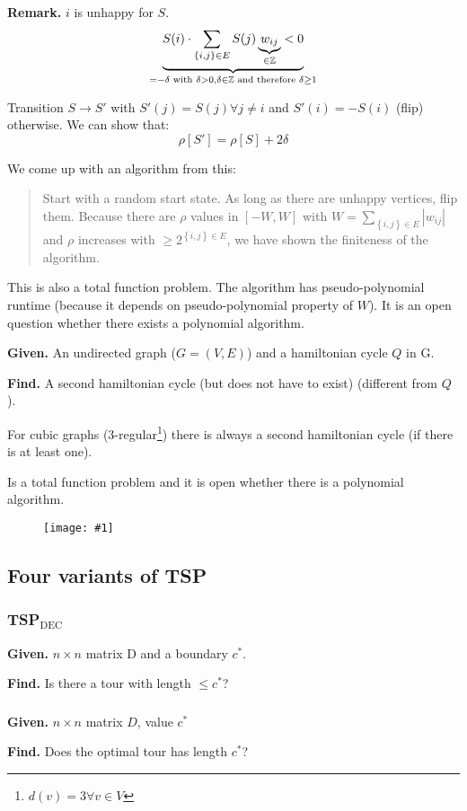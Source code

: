 \documentclass[a4paper]{article}
\newcommand{\drawing}[1]{%
 \begin{figure}[ht]
  \begin{center}
   \texttt{[image: \#1]}
  \end{center}
 \end{figure}
}
\newcommand{\given}[1]{\textbf{Given.} #1\par}
\newcommand{\find}[1]{\textbf{Find.} #1\par}
\newcommand{\probl}[1]{\text{\textsc{#1}}}
\newcommand{\card}[1]{|#1|}
\newcommand{\set}[1]{\left\{#1\right\}}
\newenvironment{spec}[0]{\begin{framed}}{\end{framed}}
\begin{document}
\textbf{Remark.} $i$ is unhappy for $S$.
\[
    \underbrace{S(i) \cdot \sum_{\set{i,j} \in E} S(j) \underbrace{w_{ij}}_{\in \mathbb{Z}} < 0}_%
        {=-\delta \text{ with } \delta > 0, \delta \in \mathbb{Z} \text{ and therefore } \delta \geq 1}
\]

Transition $S \rightarrow S'$ with $S'(j) = S(j) \forall j \neq i$ and $S'(i) = -S(i)$ (flip) otherwise.
We can show that:
\[
    \rho[S'] = \rho[S] + 2\delta
\]

We come up with an algorithm from this:
\begin{quote}
  Start with a random start state. As long as there are unhappy vertices, flip them.
  Because there are $\rho$ values in $[-W, W]$ with $W = \sum_{\set{i,j} \in E} \card{w_{ij}}$
  and $\rho$ increases with $\geq 2^{\set{i,j} \in E}$, we have shown the finiteness
  of the algorithm.
\end{quote}

This is also a total function problem. The algorithm has pseudo-polynomial runtime (because
it depends on pseudo-polynomial property of $W$). It is an open question whether there exists
a polynomial algorithm.

\begin{spec}
  \given{An undirected graph ($G = (V, E)$) and a hamiltonian cycle $Q$ in G.}
  \find{A second hamiltonian cycle (but does not have to exist) (different from $Q$).}
\end{spec}

For cubic graphs (3-regular\footnote{$d(v) = 3 \forall v \in V$})
there is always a second hamiltonian cycle (if there is at least one).

Is a total function problem and it is open whether there is a polynomial algorithm.

\drawing{fnp.pdf}

\subsection{Four variants of TSP}

\subsubsection{TSP$_{\text{DEC}}$}
%
\begin{spec}
  \given{$n\times n$ matrix D and a boundary $c^*$.}
  \find{Is there a tour with length $\leq c^*$?}
\end{spec}

\subsubsection{\probl{Exact-TSP}}
%
\begin{spec}
  \given{$n\times n$ matrix $D$, value $c^*$}
  \find{Does the optimal tour has length $c^*$?}
\end{spec}
\end{document}
